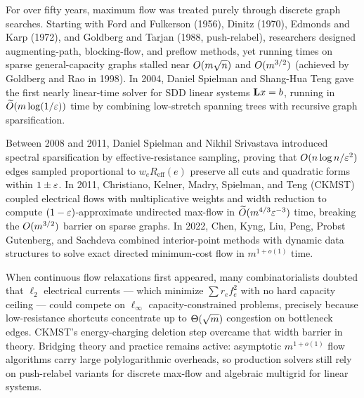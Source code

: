 \begin{historybox}
For over fifty years, maximum flow was treated purely through discrete graph searches. Starting with Ford and Fulkerson (1956), Dinitz (1970), Edmonds and Karp (1972), and Goldberg and Tarjan (1988, push-relabel), researchers designed augmenting-path, blocking-flow, and preflow methods, yet running times on sparse general-capacity graphs stalled near $O(m\sqrt{n})$ and $O(m^{3/2})$ (achieved by Goldberg and Rao in 1998). In 2004, Daniel Spielman and Shang-Hua Teng gave the first nearly linear-time solver for SDD linear systems $\mathbf{L} x = b$, running in $\widetilde{O}(m\log(1/\varepsilon))$ time by combining low-stretch spanning trees with recursive graph sparsification.

Between 2008 and 2011, Daniel Spielman and Nikhil Srivastava introduced spectral sparsification by effective-resistance sampling, proving that $O(n\log n/\varepsilon^2)$ edges sampled proportional to $w_e R_{\mathrm{eff}}(e)$ preserve all cuts and quadratic forms within $1\pm\varepsilon$. In 2011, Christiano, Kelner, Madry, Spielman, and Teng (CKMST) coupled electrical flows with multiplicative weights and width reduction to compute $(1-\varepsilon)$-approximate undirected max-flow in $\widetilde{O}(m^{4/3}\varepsilon^{-3})$ time, breaking the $O(m^{3/2})$ barrier on sparse graphs. In 2022, Chen, Kyng, Liu, Peng, Probst Gutenberg, and Sachdeva combined interior-point methods with dynamic data structures to solve exact directed minimum-cost flow in $m^{1+o(1)}$ time.

When continuous flow relaxations first appeared, many combinatorialists doubted that $\ell_2$ electrical currents --- which minimize $\sum r_e f_e^2$ with no hard capacity ceiling --- could compete on $\ell_\infty$ capacity-constrained problems, precisely because low-resistance shortcuts concentrate up to $\Theta(\sqrt{m})$ congestion on bottleneck edges. CKMST's energy-charging deletion step overcame that width barrier in theory. Bridging theory and practice remains active: asymptotic $m^{1+o(1)}$ flow algorithms carry large polylogarithmic overheads, so production solvers still rely on push-relabel variants for discrete max-flow and algebraic multigrid for linear systems.
\end{historybox}

